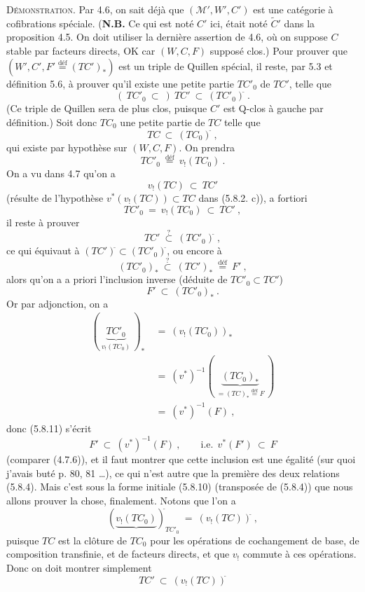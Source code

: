 \documentclass[11pt]{article}
\newcommand{\printedpage}[1]{\marginpar{\footnotesize p.~#1}}
\newcommand{\msp}[1]{\marginpar{\footnotesize [#1]}}
\newcommand{\defeq}{\overset{\text{déf}}{=}}
\newcommand{\cl}{^{\tilde{}}}%
\begin{document}
\msp{page 92}
\textsc{Démonstration}. Par 4.6, on sait déjà que $(\mathcal{M}', W', C')$ est une catégorie à cofibrations spéciale. (\textbf{N.B.} Ce qui est noté $C'$ ici, était noté $\tilde{C}'$ dans la proposition 4.5. On doit utiliser la dernière assertion de 4.6, où on suppose $C$ stable par facteurs directs, OK car $(W, C, F)$ supposé clos.) Pour prouver que $(W', C', F' \defeq (TC')_*)$ est un triple de Quillen
\printedpage{46}
spécial, il reste, par 5.3 et définition 5.6, à prouver qu'il existe une petite partie $TC'_0$ de $TC'$, telle que
\[
(\ TC'_0 \ \subset\ )\ TC' \ \subset \ (TC'_0)\cl\ .
\tag*{(5.8.6)}
\]
(Ce triple de Quillen sera de plus clos, puisque $C'$ est Q-clos à gauche par définition.) Soit donc $TC_0$ une petite partie de $TC$ telle que
\[
TC \ \subset \ (TC_0)\cl\ ,
\tag*{(5.8.7)}
\]
qui existe par hypothèse sur $(W, C, F)$. On prendra
\[
TC'_0 \ \defeq \ v_!(TC_0)\ .
\tag*{(5.8.8)}
\]
On a vu dans 4.7 qu'on a
\[
v_!(TC) \ \subset \ TC'
\tag*{(5.8.9)}
\]
(résulte de l'hypothèse $v^*(v_!(TC)) \subset TC$ dans (5.8.2. c)), a fortiori
\[
TC'_0 \ = \ v_!(TC_0) \ \subset \ TC'\ ,
\]
\msp{page 93}
il reste à prouver
\[
TC' \ \overset{?}{\subset} \ (TC'_0)\cl\ ,
\tag*{(5.8.10)}
\]
ce qui équivaut à $(TC')\cl \subset (TC'_0)\cl$, ou encore à
\[
(TC'_0)_* \ \overset{?}{\subset} \ (TC')_* \ \defeq \ F'\ ,
\tag*{(5.8.10 bis)}
\]
alors qu'on a a priori l'inclusion inverse (déduite de $TC'_0 \subset TC'$)
\[
F' \ \subset \ (TC'_0)_*\ .
\tag*{(5.8.11)}
\]
Or par adjonction, on a
\[
\begin{aligned}
(\ \underbrace{TC'_0}_{v_!(TC_0)}\ )_* \ &= \ (v_!(TC_0))_*\\
&= \ (v^*)^{-1}(\ \underbrace{(TC_0)_*}_{= (TC)_* \defeq F}\ )\\
&= \ (v^*)^{-1}(F)\ ,
\end{aligned}
\]
donc (5.8.11) s'écrit
\[
F' \ \subset \ (v^*)^{-1}(F)\ , \qquad \text{i.e.}\ \ v^*(F') \ \subset \ F
\tag*{(5.8.12)}
\]
(comparer (4.7.6)), et il faut montrer que cette inclusion est une égalité (sur quoi j'avais buté p. 80, 81 \ldots), ce qui n'est autre que la première des deux relations (5.8.4). Mais c'est sous la forme initiale (5.8.10) (transposée de (5.8.4)) que nous allons prouver la chose, finalement. Notons que l'on a
\printedpage{47}
\msp{page 94}
\[
(\underbrace{v_!(TC_0)})\cl_{TC'_0} \ = \ (v_!(TC))\cl\ ,
\]
puisque $TC$ est la clôture de $TC_0$ pour les opérations de cochangement de base, de composition transfinie, et de facteurs directs, et que $v_!$ commute à ces opérations. Donc on doit montrer simplement
\[
TC' \ \subset \ (v_!(TC))\cl
\tag*{(5.8.12 bis)}
\]
\end{document}
